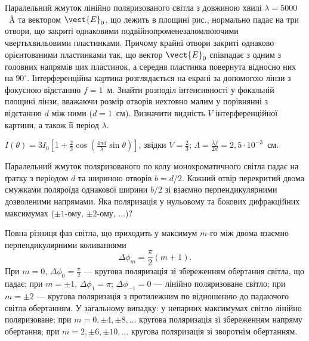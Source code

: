 \begin{problem}%
    Паралельний жмуток лінійно поляризованого світла з довжиною хвилі $ \lambda = 5000 $~\AA{} та вектором $ \vect{E}_0 $, що лежить в площині рис., нормально падає на три отвори, що закриті однаковими подвійнопроменезаломлюючими чвертьхвильовими пластинками. Причому крайні отвори закриті однаково орієнтованими пластинками так, що вектор $ \vect{E}_0 $ співпадає з одним з головних напрямів цих пластинок, а середня пластинка повернута відносно них на $ 90^\circ $. Інтерференційна картина розглядається на екрані за допомогою лінзи з фокусною відстанню $ f = 1 $~м. Знайти розподіл інтенсивності у фокальній площині лінзи, вважаючи розмір отворів нехтовно малим у порівнянні з відстанню $ d $ між ними ($ d = 1 $~см). Визначити видність $ V $ інтерференційної картини, а також її період $ \lambda $.

    \begin{center}
        
    \end{center}
    \begin{solution}
        $ I(\theta) = 3I_0 \left[1 + \frac{2}{3} \cos \left(\frac{4\pi d}{\lambda} \sin\theta\right)\right]  $, звідки $ V = \frac{2}{3} $; $ \Lambda = \frac{\lambda f}{2 d} = 2,5 \cdot 10^{-3} $~см.
    \end{solution}
\end{problem}

\begin{problem}%
    Паралельний жмуток поляризованого по колу монохроматичного
    світла падає на ґратку з періодом $ d $ та шириною отворів $ b = {d}/2 $.
    Кожний отвір перекритий двома смужками поляроїда однакової
    ширини $ b/2 $ зі взаємно перпендикулярними дозволеними напрямами.
    Яка поляризація у нульовому та бокових дифракційних максимумах ($ \pm
    1 $-ому, $ \pm 2 $-ому, $\ldots$)?
    \begin{solution}
        Повна різниця фаз світла, що приходить у максимум $ m $-го між двома взаємно
        перпендикулярними коливаннями
        \begin{equation*}
            \Delta \phi_m = \frac{\pi}{2}(m + 1) .
        \end{equation*}
        При $ m = 0 $, $\Delta \phi_0 = \frac{\pi}{2} $ --- кругова поляризація зі збереженням обертання світла, що падає; при $ m = \pm1 $, $\Delta \phi_1 = \pi $; $ \Delta \phi_{-1} = 0 $ ---  лінійно поляризоване світло; при $  m = \pm2 $ --- кругова поляризація з протилежним по відношенню до падаючого світла обертанням. У загальному випадку: у непарних максимумах світло лінійно поляризоване; при $  m = 0, \pm4, \pm8, \ldots $ кругова поляризація зі збереженням напряму обертання; при $ m = 2, \pm6, \pm10, \ldots $ кругова поляризація зі зворотнім обертанням.
    \end{solution}
\end{problem}

